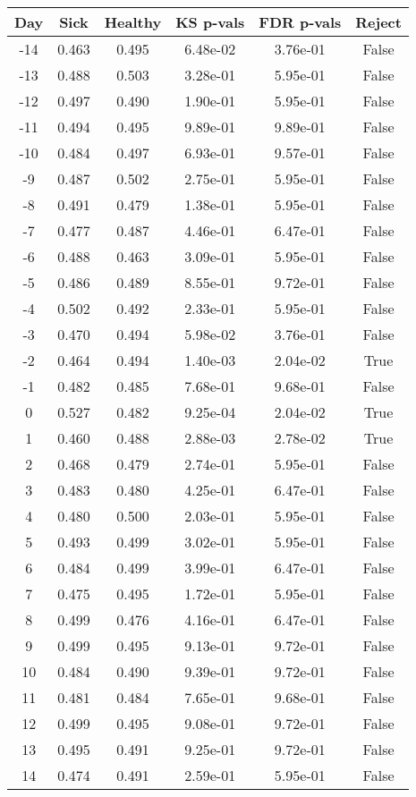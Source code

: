 \begin{tabular}{c|c|c|c|c|c}
Day &  Sick & Healthy &  KS p-vals & FDR p-vals & Reject\\
\hline
-14 & 0.463 &   0.495 &   6.48e-02 &   3.76e-01 &  False\\
-13 & 0.488 &   0.503 &   3.28e-01 &   5.95e-01 &  False\\
-12 & 0.497 &   0.490 &   1.90e-01 &   5.95e-01 &  False\\
-11 & 0.494 &   0.495 &   9.89e-01 &   9.89e-01 &  False\\
-10 & 0.484 &   0.497 &   6.93e-01 &   9.57e-01 &  False\\
 -9 & 0.487 &   0.502 &   2.75e-01 &   5.95e-01 &  False\\
 -8 & 0.491 &   0.479 &   1.38e-01 &   5.95e-01 &  False\\
 -7 & 0.477 &   0.487 &   4.46e-01 &   6.47e-01 &  False\\
 -6 & 0.488 &   0.463 &   3.09e-01 &   5.95e-01 &  False\\
 -5 & 0.486 &   0.489 &   8.55e-01 &   9.72e-01 &  False\\
 -4 & 0.502 &   0.492 &   2.33e-01 &   5.95e-01 &  False\\
 -3 & 0.470 &   0.494 &   5.98e-02 &   3.76e-01 &  False\\
 -2 & 0.464 &   0.494 &   1.40e-03 &   2.04e-02 &   True\\
 -1 & 0.482 &   0.485 &   7.68e-01 &   9.68e-01 &  False\\
  0 & 0.527 &   0.482 &   9.25e-04 &   2.04e-02 &   True\\
  1 & 0.460 &   0.488 &   2.88e-03 &   2.78e-02 &   True\\
  2 & 0.468 &   0.479 &   2.74e-01 &   5.95e-01 &  False\\
  3 & 0.483 &   0.480 &   4.25e-01 &   6.47e-01 &  False\\
  4 & 0.480 &   0.500 &   2.03e-01 &   5.95e-01 &  False\\
  5 & 0.493 &   0.499 &   3.02e-01 &   5.95e-01 &  False\\
  6 & 0.484 &   0.499 &   3.99e-01 &   6.47e-01 &  False\\
  7 & 0.475 &   0.495 &   1.72e-01 &   5.95e-01 &  False\\
  8 & 0.499 &   0.476 &   4.16e-01 &   6.47e-01 &  False\\
  9 & 0.499 &   0.495 &   9.13e-01 &   9.72e-01 &  False\\
 10 & 0.484 &   0.490 &   9.39e-01 &   9.72e-01 &  False\\
 11 & 0.481 &   0.484 &   7.65e-01 &   9.68e-01 &  False\\
 12 & 0.499 &   0.495 &   9.08e-01 &   9.72e-01 &  False\\
 13 & 0.495 &   0.491 &   9.25e-01 &   9.72e-01 &  False\\
 14 & 0.474 &   0.491 &   2.59e-01 &   5.95e-01 &  False\\
\end{tabular}